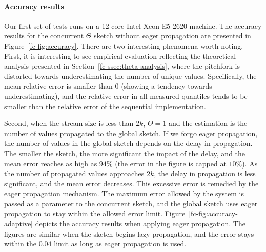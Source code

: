 \paragraph{Accuracy results}
Our first set of tests runs on a 12-core Intel Xeon E5-2620 machine. The accuracy results for the concurrent $\Theta$ sketch
without eager propagation are presented in Figure~\ref{fc-fig:accuracy}. There are two interesting phenomena worth noting.
First, it is interesting to see empirical evaluation reflecting the theoretical analysis presented in Section~\ref{fc-ssec:theta-analysis},
where the pitchfork is distorted towards underestimating the number of unique values. Specifically, the mean relative error is smaller
than $0$ (showing a tendency towards underestimating), and the relative error in all measured quantiles tends to be smaller
than the relative error of the sequential implementation.

Second, when the stream size is less than $2k$, $\Theta=1$ and the estimation is the number of values propagated to the
global sketch. If we forgo eager propagation, the number of values in the global sketch depends on the delay in propagation. The
smaller the sketch, the more significant the impact of the delay, and the mean error reaches as high as $94\%$ (the error in
the figure is capped at $10\%$). As the number of propagated values approaches $2k$, the delay in propagation is less significant, and
the mean error decreases. This excessive error is remedied by the eager propagation mechanism. The maximum error allowed by
the system is passed as a parameter to the concurrent sketch, and the global sketch uses eager propagation to stay within
the allowed error limit. Figure~\ref{fc-fig:accuracy-adaptive} depicts the accuracy results when applying eager
propagation. The figures are similar when the sketch begins lazy propagation, and the error stays within the $0.04$
limit as long as eager propagation is used.

